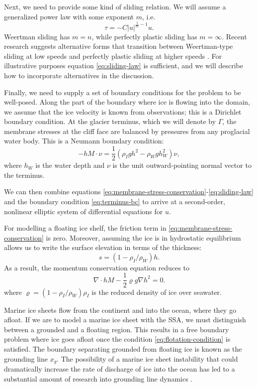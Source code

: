 \documentclass[review,oneside]{igs}
\begin{document}
Next, we need to provide some kind of sliding relation.
We will assume a generalized power law with some exponent $m$, i.e.
\begin{equation}
    \tau = -C|u|^{\frac{1}{m} - 1}u.
    \label{eq:sliding-law}
\end{equation}
Weertman sliding has $m = n$, while perfectly plastic sliding has $m = \infty$.
Recent research suggests alternative forms that transition between Weertman-type sliding at low speeds and perfectly plastic sliding at higher speeds \citep{minchew2020toward}.
For illustrative purposes equation \eqref{eq:sliding-law} is sufficient, and we will describe how to incorporate alternatives in the discussion.

Finally, we need to supply a set of boundary conditions for the problem to be well-posed.
Along the part of the boundary where ice is flowing into the domain, we assume that the ice velocity is known from observations; this is a Dirichlet boundary condition.
At the glacier terminus, which we will denote by $\Gamma$, the membrane stresses at the cliff face are balanced by pressures from any proglacial water body.
This is a Neumann boundary condition:
\begin{equation}
    -hM\cdot\nu = \frac{1}{2}\left(\rho_Igh^2 - \rho_Wgh_W^2\right)\nu,
    \label{eq:terminus-bc}
\end{equation}
where $h_W$ is the water depth and $\nu$ is the unit outward-pointing normal vector to the terminus.

We can then combine equations \eqref{eq:membrane-stress-conservation}-\eqref{eq:sliding-law} and the boundary condition \eqref{eq:terminus-bc} to arrive at a second-order, nonlinear elliptic system of differential equations for $u$.

For modelling a floating ice shelf, the friction term in \eqref{eq:membrane-stress-conservation} is zero.
Moreover, assuming the ice is in hydrostatic equilibrium allows us to write the surface elevation in terms of the thickness:
\begin{equation}
    s = (1 - \rho_I / \rho_W) h.
    \label{eq:flotation-condition}
\end{equation}
As a result, the momentum conservation equation reduces to
\begin{equation}
    \nabla\cdot hM - \frac{1}{2}\varrho g\nabla h^2 = 0.
\end{equation}
where $\varrho = (1 - \rho_I / \rho_W)\rho_I$ is the reduced density of ice over seawater.

Marine ice sheets flow from the continent and into the ocean, where they go afloat.
If we are to model a marine ice sheet with the SSA, we must distinguish between a grounded and a floating region.
This results in a free boundary problem where ice goes afloat once the condition \eqref{eq:flotation-condition} is satisfied.
The boundary separating grounded from floating ice is known as the grounding line $x_g$.
The possibility of a marine ice sheet instability that could dramatically increase the rate of discharge of ice into the ocean has led to a substantial amount of research into grounding line dynamics \citep{schoof2007mis, durand2009mis, favier2012mis}.
\end{document}
